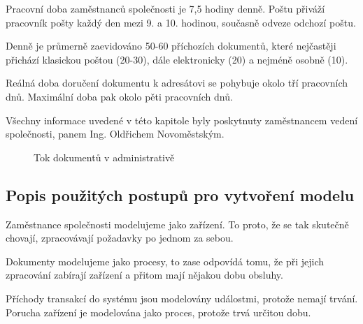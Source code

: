 \documentclass[12pt,a4paper]{article}
\begin{document}
Pracovní doba zaměstnanců společnosti je 7,5 hodiny denně. Poštu přiváží pracovník pošty každý den mezi 9. a 10. hodinou, současně odveze odchozí poštu.

Denně je průmerně zaevidováno 50-60 příchozích dokumentů, které nejčastěji při\-chá\-zí klasickou poštou (20-30), dále elektronicky (20) a nejméně osobně (10).

Reálná doba doručení dokumentu k adresátovi se pohybuje okolo tří pracovních dnů. Maximální doba pak okolo pěti pracovních dnů.

Všechny informace uvedené v této kapitole byly poskytnuty zaměstnancem vedení spo\-leč\-nos\-ti, panem Ing. Oldřichem Novoměstským.

\begin{figure}[ht]
 \begin{center}
	\caption{Tok dokumentů v administrativě}
	\label{tok_dokumentu}
 \end{center}
\end{figure}

\subsection{Popis použitých postupů pro vytvoření modelu}

Zaměstnance společnosti modelujeme jako zařízení. To proto, že se tak skutečně chovají, zpracovávají požadavky po jednom za sebou.

Dokumenty modelujeme jako procesy, to zase odpovídá tomu, že při jejich zpracování zabírají zařízení a přitom mají nějakou dobu obsluhy.

Příchody transakcí do systému jsou modelovány událostmi, protože nemají trvání. Po\-ru\-cha zařízení je modelována jako proces, protože trvá určitou dobu.
\end{document}
